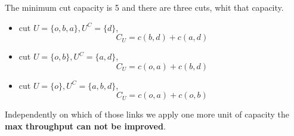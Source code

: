 \documentclass[
	12pt, %
]{fphw}
\begin{document}
\begin{enumerate}[{\bfseries (a)}]
        The minimum cut capacity is 5 and there are three cuts, whit that capacity.
        \begin{itemize}
            \item cut $U=\{o,b,a\},U^C=\{d\}$,
                    \begin{equation}
                        C_U = c(b,d) + c(a,d)
                        \label{eq:eqCut1}
                    \end{equation}
            \item cut $U=\{o,b\},U^C=\{a,d\}$,
                    \begin{equation}
                        C_U = c(o,a) + c(b,d)
                        \label{eq:eqCut2}
                    \end{equation}
            \item cut $U=\{o\},U^C=\{a,b,d\}$,
                    \begin{equation}
                        C_U = c(o,a) + c(o,b)
                        \label{eq:eqCut3}
                    \end{equation} 
        \end{itemize}
        
        Independently on which of those links we apply one more unit of capacity the \textbf{max throughput can not be improved}.


\end{enumerate}
\end{document}
